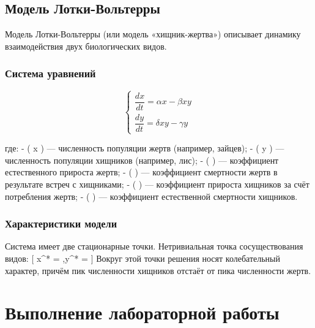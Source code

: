 \documentclass[
  letterpaper,
  DIV=11,
  numbers=noendperiod]{scrartcl}
\begin{document}
\subsection{Модель
Лотки-Вольтерры}\label{ux43cux43eux434ux435ux43bux44c-ux43bux43eux442ux43aux438-ux432ux43eux43bux44cux442ux435ux440ux440ux44b}

Модель Лотки-Вольтерры (или модель «хищник-жертва») описывает динамику
взаимодействия двух биологических видов.

\subsubsection{Система
уравнений}\label{ux441ux438ux441ux442ux435ux43cux430-ux443ux440ux430ux432ux43dux435ux43dux438ux439}

\[
\begin{cases}
\dfrac{dx}{dt} = \alpha x - \beta x y \\[1em]
\dfrac{dy}{dt} = \delta x y - \gamma y
\end{cases}
\]

где: - ( x ) --- численность популяции жертв (например, зайцев); - ( y )
--- численность популяции хищников (например, лис); - ( \alpha ) ---
коэффициент естественного прироста жертв; - ( \beta ) --- коэффициент
смертности жертв в результате встреч с хищниками; - ( \delta ) ---
коэффициент прироста хищников за счёт потребления жертв; - ( \gamma )
--- коэффициент естественной смертности хищников.

\subsubsection{Характеристики
модели}\label{ux445ux430ux440ux430ux43aux442ux435ux440ux438ux441ux442ux438ux43aux438-ux43cux43eux434ux435ux43bux438}

Система имеет две стационарные точки. Нетривиальная точка
сосуществования видов: {[} x\^{}* = \frac{\gamma}{\delta},\quad y\^{}* =
\frac{\alpha}{\beta} {]} Вокруг этой точки решения носят колебательный
характер, причём пик численности хищников отстаёт от пика численности
жертв.

\section{Выполнение лабораторной
работы}\label{ux432ux44bux43fux43eux43bux43dux435ux43dux438ux435-ux43bux430ux431ux43eux440ux430ux442ux43eux440ux43dux43eux439-ux440ux430ux431ux43eux442ux44b}
\end{document}
